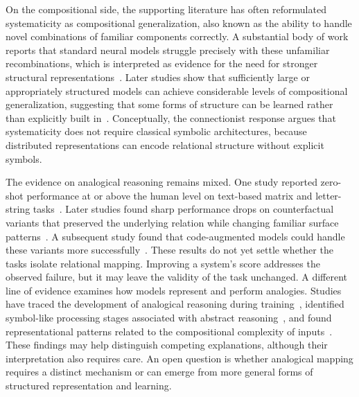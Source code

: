 \documentclass[acmsmall,screen,review,anonymous]{acmart}
\begin{document}
 
On the compositional side, the supporting literature has often reformulated systematicity as compositional generalization, also known as the ability to handle novel combinations of familiar components correctly.
%
A substantial body of work reports that standard neural models struggle precisely with these unfamiliar recombinations, which is interpreted as evidence for the need for stronger structural representations~\citep{lake2018compskill, keysers2020measuringcompositionalgeneralizationcomprehensive, kim-linzen-2020-cogs}. 
%
Later studies show that sufficiently large or appropriately structured models can achieve considerable levels of compositional generalization, suggesting that some forms of structure can be learned rather than explicitly built in~\citep{csordas2021devil}.
%
Conceptually, the connectionist response argues that systematicity does not require classical symbolic architectures, because distributed representations can encode relational structure without explicit symbols. 
 

The evidence on analogical reasoning remains mixed.
%
One study reported zero-shot performance at or above the human level on text-based matrix and letter-string tasks~\citep{Webb2022EmergentAR}.
%
Later studies found sharp performance drops on counterfactual variants that preserved the underlying relation while changing familiar surface patterns~\citep{hodel2024responseemergentanalogicalreasoning, lewis2024usingcounterfactualtasksevaluate}.
%
A subsequent study found that code-augmented models could handle these variants more successfully~\citep{webb2025evidence}.
%
These results do not yet settle whether the tasks isolate relational mapping.
%
Improving a system's score addresses the observed failure, but it may leave the validity of the task unchanged.
%
A different line of evidence examines how models represent and perform analogies.
%
Studies have traced the development of analogical reasoning during training~\citep{minegishi2026emergentanalogicalreasoningtransformers}, identified symbol-like processing stages associated with abstract reasoning~\citep{pmlr-v267-yang25c}, and found representational patterns related to the compositional complexity of inputs~\citep{lee-etal-2025-geometric}.
%
These findings may help distinguish competing explanations, although their interpretation also requires care.
%
An open question is whether analogical mapping requires a distinct mechanism or can emerge from more general forms of structured representation and learning.
\end{document}
